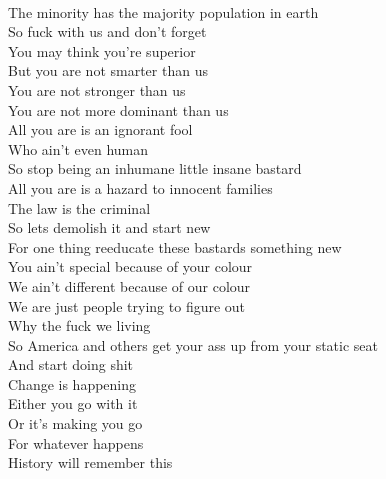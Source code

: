 \documentclass[12pt, b5paper]{article}
\begin{document}
\\The minority has the majority population in earth
\\So fuck with us and don't forget
\\You may think you're superior
\\But you are not smarter than us
\\You are not stronger than us
\\You are not more dominant than us
\\All you are is an ignorant fool
\\Who ain't even human
\\So stop being an inhumane little insane bastard
\\All you are is a hazard to innocent families
\\The law is the criminal
\\So lets demolish it and start new
\\For one thing reeducate these bastards something new
\\You ain't special because of your colour
\\We ain't different because of our colour
\\We are just people trying to figure out
\\Why the fuck we living
\\So America and others get your ass up from your static seat
\\And start doing shit
\\Change is happening
\\Either you go with it
\\Or it's making you go
\\For whatever happens
\\History will remember this 

\newpage 
\end{document}
